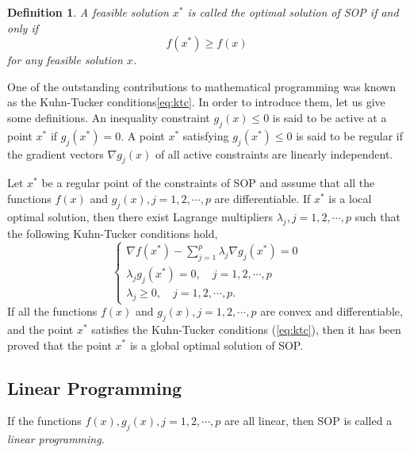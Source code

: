 \newtheorem{mpdefop}[mpdef]{Definition}
\begin{mpdefop}
A feasible solution $x^*$ is called the optimal
solution of SOP if and only if
\begin{equation}
f(x^*)\ge f(x)
\end{equation}
for any feasible solution $x$.
\end{mpdefop}

One of the outstanding contributions to mathematical programming was known as
the Kuhn-Tucker conditions\ref{eq:ktc}. In order to introduce them, let us give
some definitions. An inequality constraint $g_j(x)\le 0$ is said to be active at
a point $x^*$ if $g_j(x^*)=0$. A point $x^*$ satisfying $g_j(x^*)\le 0$ is said
to be regular if the gradient vectors $\nabla g_j(x)$ of all active constraints
are linearly independent.

Let $x^*$ be a regular point of the constraints of SOP and assume that all the
functions $f(x)$ and $g_j(x),j=1,2,\cdots,p$ are differentiable. If $x^*$ is a
local optimal solution, then there exist Lagrange multipliers
$\lambda_j,j=1,2,\cdots,p$ such that the following Kuhn-Tucker conditions hold,
\begin{equation}
\label{eq:ktc}
\left\{\begin{array}{l}
    \nabla f(x^*)-\sum\limits_{j=1}^p\lambda_j\nabla g_j(x^*)=0\\[0.3cm]
    \lambda_jg_j(x^*)=0,\quad j=1,2,\cdots,p\\[0.2cm]
    \lambda_j\ge 0,\quad j=1,2,\cdots,p.
\end{array}\right.
\end{equation}
If all the functions $f(x)$ and $g_j(x),j=1,2,\cdots,p$ are convex and
differentiable, and the point $x^*$ satisfies the Kuhn-Tucker conditions
(\ref{eq:ktc}), then it has been proved that the point $x^*$ is a global optimal
solution of SOP.

\subsection{Linear Programming}
\label{sec:lp}

If the functions $f(x),g_j(x),j=1,2,\cdots,p$ are all linear, then SOP is called
a {\em linear programming}.

